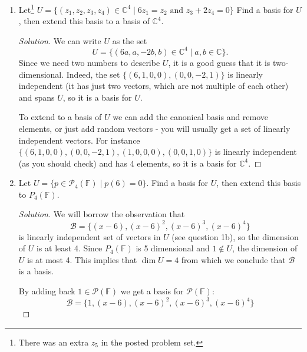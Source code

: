 \documentclass[a4paper,11pt]{article}
\theoremstyle{definition}
\newenvironment{solution}
  {\renewcommand\qedsymbol{$\blacksquare$}\begin{proof}[Solution]}
  {\end{proof}}
\begin{document}
\begin{enumerate}[(1)]
\begin{solution}
In the case of $\mathcal P_7(\mathbb F)$, a basis for even polynomials is $\{1,x^2,x^4,x^6\}$.
\end{solution}

\item
Let\footnote{There was an extra $z_5$ in the posted problem set.} $U = 
\{
(z_1,z_2,z_3,z_4)\in\mathbb C^4
\mid
6z_1=z_2\text{ and }
z_3+2z_4=0
\}
$
Find a basis for $U$, then extend this basis to a basis of $\mathbb C^4$.
\begin{solution}
We can write $U$ as the set
\[
U = 
\{
(6a,a,-2b,b)\in\mathbb C^4
\mid
a,b\in\mathbb C
\}.
\]
Since we need two numbers to describe $U$, it is a good guess that it is two-dimensional.
Indeed, the set $\{(6,1,0,0),(0,0,-2,1)\}$ is linearly independent (it has just two vectors, which are not multiple of each other) and spans $U$, so it is a basis for $U$.

To extend to a basis of $U$ we can add the canonical basis and remove elements, or just add random vectors - you will usually get a set of linearly independent vectors.
For instance
$\{(6,1,0,0),(0,0,-2,1),(1,0,0,0),(0,0,1,0)\}$
is linearly independent (as you should check) and has 4 elements, so it is a basis for $\mathbb C^4$.
\end{solution}

\item 
Let $U = \{p\in\mathcal P_4(\mathbb F)\mid p(6)=0\}$.
Find a basis for $U$, then extend this basis to $P_4(\mathbb F)$.
\begin{solution}
We will borrow the observation that
\[
\mathcal B=\{
(x-6),(x-6)^2,(x-6)^3,(x-6)^4
\}
\]
is linearly independent set of vectors in $U$ (see question 1b), so the dimension of $U$ is at least 4.
Since $P_4(\mathbb F)$ is 5 dimensional and $1\notin U$, the dimension of $U$ is at most 4.
This implies that $\dim U = 4$ from which we conclude that $\mathcal B$ is a basis.

By adding back $1\in\mathcal P(\mathbb F)$ we get a basis for $\mathcal P(\mathbb F)$:
\[
\mathcal B=\{
1,(x-6),(x-6)^2,(x-6)^3,(x-6)^4
\}
\]
\end{solution}



\end{enumerate}
\end{document}
